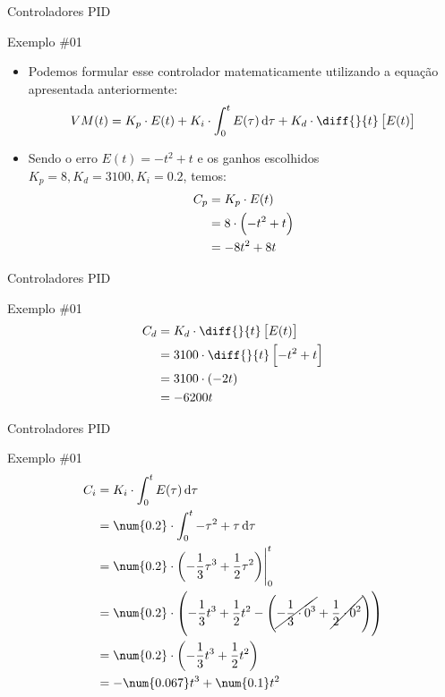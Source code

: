 \begin{frame}{Controladores PID}
	\begin{block}{Exemplo \#01}
		\begin{itemize}
			\item Podemos formular esse controlador matematicamente utilizando a equação apresentada anteriormente:
			\[ VM(t)=K_p\cdot E(t)+K_i\cdot \int_{0}^{t}E(\tau)\dif \tau +K_d\cdot\diff{}{t}\sbr{E(t)} \]
			\item Sendo o erro $ E(t)=-t^{2}+t $ e os ganhos escolhidos $ K_p=8, K_d=3100, K_i=\num{0.2} $, temos:
			\begin{align*}
				C_p	&=K_p\cdot E(t)\\
					&=8\cdot\del{-t^{2}+t}\\
					&=-8t^{2}+8t
			\end{align*}
		\end{itemize}
	\end{block}
\end{frame}


\begin{frame}{Controladores PID}
	\begin{block}{Exemplo \#01}
		\begin{align*}
			C_d	&=K_d\cdot\diff{}{t}\sbr{E(t)}\\
			&=3100\cdot\diff{}{t}\sbr{-t^{2}+t}\\
			&=3100\cdot\del{-2t}\\
			&=-6200t
		\end{align*}
	\end{block}
\end{frame}


\begin{frame}{Controladores PID}
	\begin{block}{Exemplo \#01}
		\begin{align*}
		C_i	&=K_i\cdot \int_{0}^{t}E(\tau)\dif \tau\\
		&=\num{0.2}\cdot \int_{0}^{t}-\tau^{2}+\tau\dif \tau\\
		&=\num{0.2}\cdot \eval{\del{-\dfrac{1}{3}\tau^{3}+\dfrac{1}{2}\tau^{2}}}_{0}^{t}\\
		&=\num{0.2}\cdot\del{-\dfrac{1}{3}t^{3}+\dfrac{1}{2}t^{2}-\del{\cancel{-\dfrac{1}{3}\cdot0^{3}}+\cancel{\dfrac{1}{2}\cdot0^{2}}}}\\
		&=\num{0.2}\cdot\del{-\dfrac{1}{3}t^{3}+\dfrac{1}{2}t^{2}}\\
		&=-\num{0.067}t^{3}+\num{0.1}t^{2}
		\end{align*}
	\end{block}
\end{frame}


